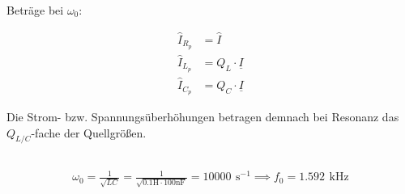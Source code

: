 \documentclass[a4paper, 12pt]{article}
\begin{document}
    Beträge bei $\omega_0$:

    \begin{align*}
      \hat{I}_{R_p} &= \hat{I}\\
      \hat{I}_{L_p} &= Q_L \cdot \underline{I}\\
      \hat{I}_{C_p} &= Q_C \cdot \underline{I}
    \end{align*}

    Die Strom- bzw. Spannungsüberhöhungen betragen demnach bei Resonanz das $Q_{L/C}$-fache der Quellgrößen.

  \subsection{}
    \begin{gather*}
      \omega_0 = \frac{1}{\sqrt{LC}} = \frac{1}{\sqrt{0.1 \si{\henry} \cdot 100 \si{\nano\farad}}} = 10000 \,\ \si{\second}^{-1} \implies f_0 = 1.592 \,\ \si{\kilo\hertz}
    \end{gather*}

    \vspace{0.013155617496424828\paperheight}
\end{document}
